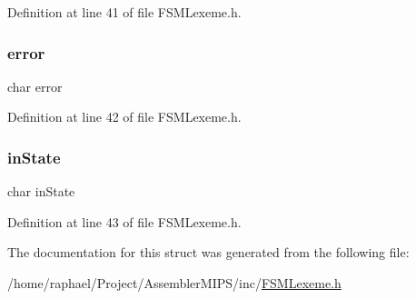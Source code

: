 Definition at line 41 of file F\+S\+M\+Lexeme.\+h.

\mbox{\label{struct_l_e_x_e_m_e___f_s_m_a1b39a1a9b9888563c380903bcba6ecf4}} 
\subsubsection{\texorpdfstring{error}{error}}
{\footnotesize\ttfamily char error}



Definition at line 42 of file F\+S\+M\+Lexeme.\+h.

\mbox{\label{struct_l_e_x_e_m_e___f_s_m_a3c3253f225f622698d3c4b407d0b262b}} 
\subsubsection{\texorpdfstring{in\+State}{inState}}
{\footnotesize\ttfamily char in\+State}



Definition at line 43 of file F\+S\+M\+Lexeme.\+h.



The documentation for this struct was generated from the following file\+:\begin{DoxyCompactItemize}
\item 
/home/raphael/\+Project/\+Assembler\+M\+I\+P\+S/inc/\mbox{\hyperlink{_f_s_m_lexeme_8h}{F\+S\+M\+Lexeme.\+h}}\end{DoxyCompactItemize}
